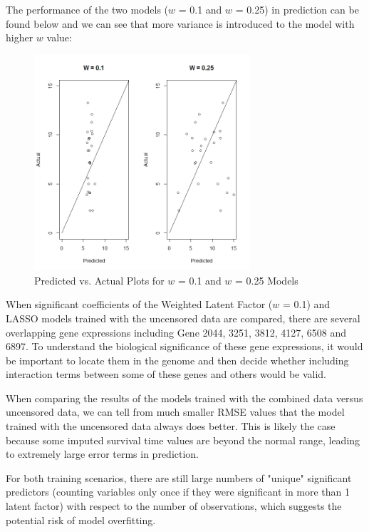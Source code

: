 \documentclass[a4paper]{article}
\begin{document}
The performance of the two models ($w$ = 0.1 and $w$ = 0.25) in prediction can be found below and we can see that more variance is introduced to the model with higher $w$ value:

\begin{figure}[H]
\centering
\includegraphics[width=80mm]{pred_uncens.png}
\caption{Predicted vs. Actual Plots for $w$ = 0.1 and $w$ = 0.25 Models}
\end{figure}

When significant coefficients of the Weighted Latent Factor ($w$ = 0.1) and LASSO models trained with the uncensored data are compared, there are several overlapping gene expressions including Gene 2044, 3251, 3812, 4127, 6508 and 6897. To understand the biological significance of these gene expressions, it would be important to locate them in the genome and then decide whether including interaction terms between some of these genes and others would be valid.

When comparing the results of the models trained with the combined data versus uncensored data, we can tell from much smaller RMSE values that the model trained with the uncensored data always does better. This is likely the case because some imputed survival time values are beyond the normal range, leading to extremely large error terms in prediction.

For both training scenarios, there are still large numbers of "unique" significant predictors (counting variables only once if they were significant in more than 1 latent factor) with respect to the number of observations, which suggests the potential risk of model overfitting.
\end{document}
